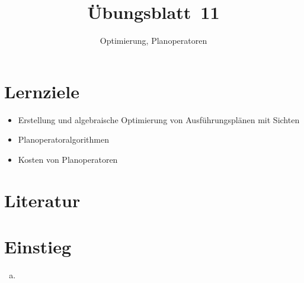 \usetikzlibrary{arrows, calc}


\title{Übungsblatt~11}
\subtitle{Optimierung, Planoperatoren}
\maketitle




\section*{Lernziele}
\begin{itemize}
    \item Erstellung und algebraische Optimierung von Ausführungsplänen mit Sichten
    \item Planoperatoralgorithmen
    \item Kosten von Planoperatoren
\end{itemize}


\section*{Literatur}



\NeumannFifteen


\section{Einstieg}
\begin{enumerate}[a)]
\item 


\end{enumerate}



\begin{deeper}

\end{deeper}

\begin{deeper}

\end{deeper}

\begin{deeper}

\end{deeper}

\beamertxt{\pagebreak}


\beamertxt{\pagebreak}
\begin{deeper}

\end{deeper}


